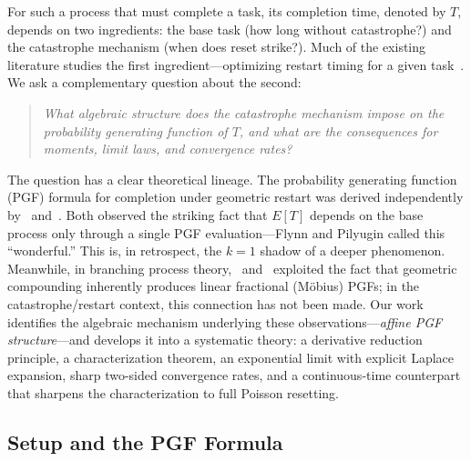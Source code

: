 \documentclass[11pt]{article}
\theoremstyle{plain}
\theoremstyle{definition}
\theoremstyle{remark}
\begin{document}
For such a process that must complete a task, its completion time, denoted by $T$, depends on two ingredients: the base task (how long without catastrophe?) and the catastrophe mechanism (when does reset strike?).  Much of the existing literature studies the first ingredient---optimizing restart timing for a given task~\cite{Reuveni16, PalReuveni17, CS18}.  We ask a complementary question about the second:

\begin{quote}
\emph{What algebraic structure does the catastrophe mechanism impose on the probability generating function of $T$, and what are the consequences for moments, limit laws, and convergence rates?}
\end{quote}

The question has a clear theoretical lineage. The probability generating function (PGF) formula for completion under geometric restart was derived independently by~\cite{BP21} and~\cite{FP21}.  Both observed the striking fact that $E[T]$ depends on the base process only through a single PGF evaluation---Flynn and Pilyugin called this ``wonderful.''  This is, in retrospect, the $k=1$ shadow of a deeper phenomenon.  Meanwhile, in branching process theory,~\cite{Agresti74} and~\cite{Sagitov13} exploited the fact that geometric compounding inherently produces linear fractional (M\"obius) PGFs; in the catastrophe/restart context, this connection has not been made. Our work identifies the algebraic mechanism underlying these observations---\emph{affine PGF structure}---and develops it into a systematic theory: a derivative reduction principle, a characterization theorem, an exponential limit with explicit Laplace expansion, sharp two-sided convergence rates, and a continuous-time counterpart that sharpens the characterization to full Poisson resetting. %


\subsection{Setup and the PGF Formula}
\end{document}
